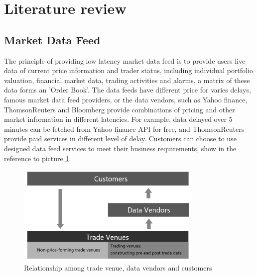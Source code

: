 \documentclass[11pt,openright,a4paper]{report}
\begin{document}
\begin{table}[]
\begin{tabular}{@{}l|l@{}}
	\end{tabular}
\end{table}
\section{Literature review}
\subsection{Market Data Feed}
The principle of providing low latency market data feed is to provide users live data of current price information and trader status, including individual portfolio valuation, financial market data, trading activities and alarms, a matrix of these data forms an 'Order Book'. The data feeds have different price for varies delays, famous market data feed providers, or the data vendors, such as Yahoo finance, ThomsonReuters and Bloomberg provide combinations of pricing and other market information in different latencies. For example, data delayed over 5 minutes can be fetched from Yahoo finance API for free\cite{financeyahoo}, and ThomsonReuters provide paid services in different level of delay. Customers can choose to use designed data feed services to meet their business requirements, show in the reference to picture \ref{fig:1}.\\
\begin{figure}[htbp] 
\centering\includegraphics[width=3.5in]{picture/tradevenue.PNG} 
\caption{Relationship among trade venue, data vendors and customers}
\label{fig:1} 
\end{figure} 
\end{document}
